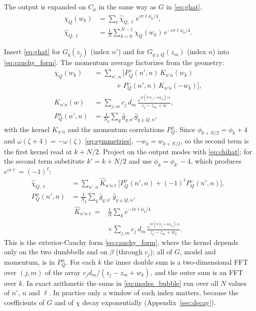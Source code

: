\documentclass[aps,prb,reprint,a4paper]{revtex4-2}
\begin{document}
The output is expanded on $C_\mu$ in the same way as $G$ in \eqref{eq:ghat},
\begin{equation}
  \begin{aligned}
  \chi_Q(w_k)&=\sum_\ell\hat\chi_{Q,\ell}\,e^{i\pi\ell\phi_k/4},\\
  \hat\chi_{Q,\ell}&=\frac1N\sum_{k=0}^{N-1}\chi_Q(w_k)\,e^{-i\pi\ell\phi_k/4}.
  \end{aligned}
  \label{eq:chihat}
\end{equation}

Insert \eqref{eq:ghat} for $G_q(z_j)$ (index $n'$) and for $G_{q\pm Q}(z_m)$ (index $n$) into \eqref{eq:cauchy_form}. The momentum average factorizes from the geometry:
\begin{equation}
  \begin{aligned}
  \chi_Q(w_k)&=\sum_{n',n}\Big[P^+_Q(n',n)\,K_{n'n}(w_k)\\
  &\qquad\quad+P^-_Q(n',n)\,K_{n'n}(-w_k)\Big],\\
  K_{n'n}(w)&=\sum_{j,m}c_j\,d_m\,\frac{e^{i\pi(n'\phi_j+n\phi_m)/4}}{z_j-z_m+w},\\
  P^\pm_Q(n',n)&=\frac1{N_q}\sum_q\hat g_{q,n'}\hat g_{q\pm Q,n},
  \end{aligned}
\end{equation}
with the kernel $K_{n'n}$ and the momentum correlations $P^\pm_Q$. Since $\phi_{k+N/2}=\phi_k+4$ and $\omega(\zeta+4)=-\omega(\zeta)$ \eqref{eq:symmetries}, $-w_k=w_{k+N/2}$, so the second term is the first kernel read at $k+N/2$. Project on the output modes with \eqref{eq:chihat}; for the second term substitute $k'=k+N/2$ and use $\phi_k=\phi_{k'}-4$, which produces $e^{i\pi\ell}=(-1)^\ell$:
\begin{equation}
  \begin{aligned}
  \hat\chi_{Q,\ell}&=\sum_{n',n}\widehat K_{n'n\ell}\big[P^+_Q(n',n)+(-1)^\ell P^-_Q(n',n)\big],\\
  P^\pm_Q(n',n)&=\frac1{N_q}\sum_q\hat g_{q,n'}\,\hat g_{q\pm Q,n},
  \end{aligned}
  \label{eq:modes_bubble}
\end{equation}
\begin{equation}
\begin{aligned}
\widehat K_{n'n\ell}={}&\frac1N\sum_ke^{-i\pi\ell\phi_k/4}\\
&\times\sum_{j,m}c_j\,d_m\,\frac{e^{i\pi(n'\phi_j+n\phi_m)/4}}{z_j-z_m+w_k}.
\end{aligned}
\label{eq:kernel}
\end{equation}
This is the exterior-Cauchy form \eqref{eq:cauchy_form}, where the kernel depends only on the two dumbbells and on $\beta$ (through $c_j$); all of $G$, model and momentum, is in $P^\pm_Q$. For each $k$ the inner double sum is a two-dimensional FFT over $(j,m)$ of the array $c_jd_m/(z_j-z_m+w_k)$, and the outer sum is an FFT over $k$. In exact arithmetic the sums in \eqref{eq:modes_bubble} run over all $N$ values of $n'$, $n$ and $\ell$. In practice only a window of each index matters, because the coefficients of $G$ and of $\chi$ decay exponentially (Appendix~\ref{sec:decay}).
\end{document}
